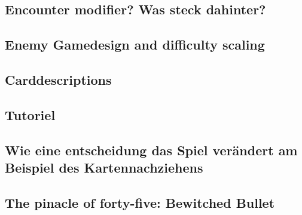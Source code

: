 \subsection{Encounter modifier? Was steck dahinter?}\label{subsec:placementMatters}


\subsection{Enemy Gamedesign and difficulty scaling}\label{subsec:placementMatters}







\subsection{Carddescriptions}\label{subsec:placementMatters}

\subsection{Tutoriel}\label{subsec:placementMatters}



%


\subsection{Wie eine entscheidung das Spiel verändert am Beispiel des Kartennachziehens}\label{subsec:placementMatters}




\subsection{The pinacle of forty-five: Bewitched Bullet}\label{subsec:placementMatters}


\renewcommand{\kapitelautor}{}
